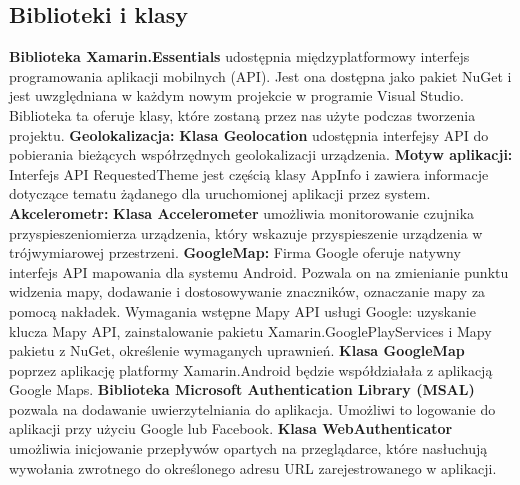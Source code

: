 \subsection{Biblioteki i klasy}
\hspace{1cm} \textbf{Biblioteka Xamarin.Essentials} udostępnia międzyplatformowy interfejs programowania aplikacji mobilnych (API). Jest ona dostępna jako pakiet NuGet i jest uwzględniana w każdym nowym projekcie w programie Visual Studio.
Biblioteka ta oferuje klasy, które zostaną przez nas użyte podczas tworzenia projektu.
\newline
\textbf{Geolokalizacja:}
\newline
\textbf{Klasa Geolocation} udostępnia interfejsy API do pobierania bieżących współrzędnych geolokalizacji urządzenia.
\newline
\textbf{Motyw aplikacji:}
\newline
Interfejs API RequestedTheme jest częścią klasy AppInfo i zawiera informacje dotyczące tematu żądanego dla uruchomionej aplikacji przez system.
\newline
\textbf{Akcelerometr:}
\newline
\textbf{Klasa Accelerometer} umożliwia monitorowanie czujnika przyspieszeniomierza urządzenia, który wskazuje przyspieszenie urządzenia w trójwymiarowej przestrzeni.
\newline
\textbf{GoogleMap:}
\newline
Firma Google oferuje natywny interfejs API mapowania dla systemu Android. Pozwala on na zmienianie punktu widzenia mapy, dodawanie i dostosowywanie znaczników, oznaczanie mapy za pomocą nakładek.
\newline
Wymagania wstępne Mapy API usługi Google: uzyskanie klucza Mapy API, zainstalowanie pakietu Xamarin.GooglePlayServices i Mapy pakietu z NuGet, określenie wymaganych uprawnień.
\newline
\textbf{Klasa GoogleMap} poprzez aplikację platformy Xamarin.Android będzie współdziałała z aplikacją Google Maps.
\newline
\newline
\textbf{Biblioteka Microsoft Authentication Library (MSAL)} pozwala na dodawanie uwierzytelniania do aplikacja. Umożliwi to logowanie do aplikacji przy użyciu Google lub Facebook.
\newline
\textbf{Klasa WebAuthenticator} umożliwia inicjowanie przepływów opartych na przeglądarce, które nasłuchują wywołania zwrotnego do określonego adresu URL zarejestrowanego w aplikacji.
\newline

